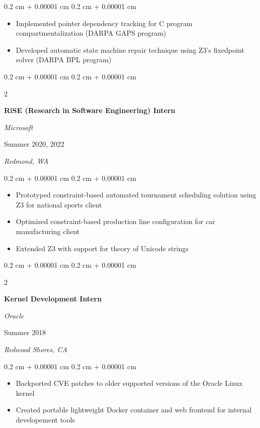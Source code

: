\documentclass[10pt, letterpaper]{article}
\newenvironment{highlights}{
    \begin{itemize}[
        topsep=0.05 cm,
        parsep=0.05 cm,
        partopsep=0pt,
        itemsep=0pt,
        leftmargin=0.4 cm + 10pt
    ]
}{
    \end{itemize}
} %
\newenvironment{onecolentry}{
    \begin{adjustwidth}{
        0.2 cm + 0.00001 cm
    }{
        0.2 cm + 0.00001 cm
    }
}{
    \end{adjustwidth}
} %
\newenvironment{twocolentry}[2][]{
    \onecolentry
    \def\secondColumn{#2}
    \setcolumnwidth{\fill, 5.5 cm}
    \begin{paracol}{2}
}{
    \switchcolumn \raggedleft \secondColumn
    \end{paracol}
    \endonecolentry
} %
\begin{document}
        \vspace{0.10 cm}
        \begin{onecolentry}
            \begin{highlights}
                \item Implemented pointer dependency tracking for C program compartmentalization (DARPA GAPS program)
                \item Developed automatic state machine repair technique using Z3's fixedpoint solver (DARPA BPL program)
            \end{highlights}
        \end{onecolentry}

        \vspace{0.4 cm}

        \begin{twocolentry}{
        Summer 2020, 2022
            
        \textit{Redmond, WA}}
            \textbf{RiSE (Research in Software Engineering) Intern}
            
            \textit{Microsoft}
        \end{twocolentry}

        \vspace{0.10 cm}
        \begin{onecolentry}
            \begin{highlights}
                \item Prototyped constraint-based automated tournament scheduling solution using Z3 for national sports client
                \item Optimized constraint-based production line configuration for car manufacturing client
                \item Extended Z3 with support for theory of Unicode strings
            \end{highlights}
        \end{onecolentry}

        \vspace{0.4 cm}

        \begin{twocolentry}{
        Summer 2018
            
        \textit{Redwood Shores, CA}}
            \textbf{Kernel Development Intern}
            
            \textit{Oracle}
        \end{twocolentry}

        \vspace{0.10 cm}
        \begin{onecolentry}
            \begin{highlights}
                \item Backported CVE patches to older supported versions of the Oracle Linux kernel
                \item Created portable lightweight Docker container and web frontend for internal developement tools
            \end{highlights}
        \end{onecolentry}
    
\end{document}

